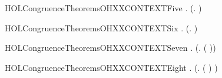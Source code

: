 \newcommand{\HOLCongruenceTheoremsOHXXCONTEXTFour}{\UseVerbatim{HOLCongruenceTheoremsOHXXCONTEXTFour}}
\begin{SaveVerbatim}{HOLCongruenceTheoremsOHXXCONTEXTFive}
\HOLTokenTurnstile{} \HOLSymConst{\HOLTokenForall{}} .   \HOLSymConst{\HOLTokenImp{}}  (\HOLTokenLambda{}.   \HOLSymConst{\ensuremath{\parallel}} )
\end{SaveVerbatim}
\newcommand{\HOLCongruenceTheoremsOHXXCONTEXTFive}{\UseVerbatim{HOLCongruenceTheoremsOHXXCONTEXTFive}}
\begin{SaveVerbatim}{HOLCongruenceTheoremsOHXXCONTEXTSix}
\HOLTokenTurnstile{} \HOLSymConst{\HOLTokenForall{}} .   \HOLSymConst{\HOLTokenImp{}}  (\HOLTokenLambda{}.  \HOLSymConst{\ensuremath{\parallel}}  )
\end{SaveVerbatim}
\newcommand{\HOLCongruenceTheoremsOHXXCONTEXTSix}{\UseVerbatim{HOLCongruenceTheoremsOHXXCONTEXTSix}}
\begin{SaveVerbatim}{HOLCongruenceTheoremsOHXXCONTEXTSeven}
\HOLTokenTurnstile{} \HOLSymConst{\HOLTokenForall{}} .   \HOLSymConst{\HOLTokenImp{}}  (\HOLTokenLambda{}. \HOLConst{\ensuremath{\nu}}  ( ))
\end{SaveVerbatim}
\newcommand{\HOLCongruenceTheoremsOHXXCONTEXTSeven}{\UseVerbatim{HOLCongruenceTheoremsOHXXCONTEXTSeven}}
\begin{SaveVerbatim}{HOLCongruenceTheoremsOHXXCONTEXTEight}
\HOLTokenTurnstile{} \HOLSymConst{\HOLTokenForall{}} .   \HOLSymConst{\HOLTokenImp{}}  (\HOLTokenLambda{}.  ( ) )
\end{SaveVerbatim}
\newcommand{\HOLCongruenceTheoremsOHXXCONTEXTEight}{\UseVerbatim{HOLCongruenceTheoremsOHXXCONTEXTEight}}
